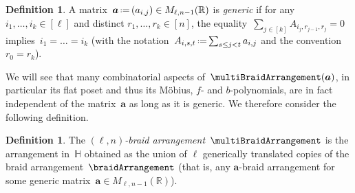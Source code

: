 \documentclass{amsart}
\newcommand{\darkblue}{\color{darkblue}} %
\theoremstyle{definition}
\newtheorem{definition}[theorem]{Definition}
\newtheorem{remark}[theorem]{Remark}
\newcommand{\R}{\mathbb{R}} %
\renewcommand{\b}[1]{{\boldsymbol{#1}}} %
\newcommand{\set}[2]{\left\{ #1 \;\middle|\; #2 \right\}} %
\newcommand{\eqdef}{\mbox{\,\raisebox{0.2ex}{\scriptsize\ensuremath{\mathrm:}}\ensuremath{=}\,}} %
\newcommand{\defn}[1]{\textsl{\darkblue #1}} %
\renewcommand{\b}[1]{\boldsymbol{#1}} %
\newcommand{\HH}{\mathbb{H}} %
\begin{document}
\begin{definition}
A matrix~$\b{a} \eqdef (a_{i,j}) \in M_{\ell,n-1}(\R)$ is \defn{generic} if for any~$i_1, \dots, i_k \in [\ell]$ and distinct $r_1, \dots, r_k \in [n]$, the equality~$\sum_{j \in [k]} A_{i_j, r_{j-1}, r_j} = 0$ implies~$i_1 = \dots = i_k$ (with the notation~$A_{i,s,t} \eqdef \smash{\sum_{s \le j < t} a_{i,j}}$ and the convention~$r_0 = r_k$).
\end{definition}

We will see that many combinatorial aspects of~$\multiBraidArrangement(\b{a})$, in particular its flat poset and thus its M\"obius, $f$- and $b$-polynomials, are in fact independent of the matrix~$\b{a}$ as long as it is generic.
We therefore consider the following definition.

\begin{definition}
\label{def:multiBraidArrangement}
The \defn{$(\ell,n)$-braid arrangement}~$\multiBraidArrangement$ is the arrangement in~$\HH$ obtained as the union of $\ell$ generically translated copies of the braid arrangement~$\braidArrangement$ (that is, any $\b{a}$-braid arrangement for some generic matrix~$\b{a} \in M_{\ell,n-1}(\R)$).
\end{definition}

\end{document}
